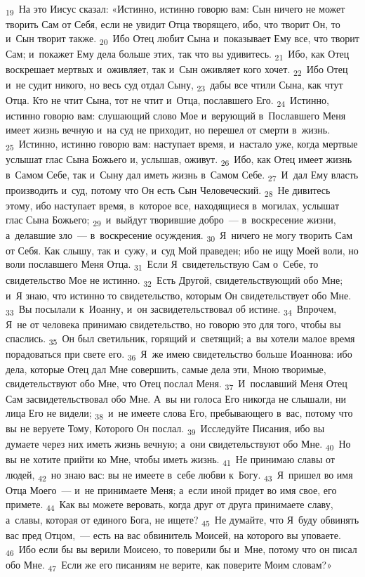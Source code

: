 \documentclass[a4paper,12pt]{article}
\begin{document}
\textsubscript{19}~На это Иисус сказал: «Истинно, истинно говорю вам: Сын ничего не может творить Сам от Себя, если не увидит Отца творящего, ибо, что творит Он, то и~Сын творит также. \textsubscript{20}~Ибо Отец любит Сына и~показывает Ему все, что творит Сам; и~покажет Ему дела больше этих, так что вы удивитесь. \textsubscript{21}~Ибо, как Отец воскрешает мертвых и~оживляет, так и~Сын оживляет кого хочет. \textsubscript{22}~Ибо Отец и~не судит никого, но весь суд отдал Сыну, \textsubscript{23}~дабы все чтили Сына, как чтут Отца. Кто не чтит Сына, тот не чтит и~Отца, пославшего Его. \textsubscript{24}~Истинно, истинно говорю вам: слушающий слово Мое и~верующий в~Пославшего Меня имеет жизнь вечную и~на суд не приходит, но перешел от смерти в~жизнь. \textsubscript{25}~Истинно, истинно говорю вам: наступает время, и~настало уже, когда мертвые услышат глас Сына Божьего и, услышав, оживут. \textsubscript{26}~Ибо, как Отец имеет жизнь в~Самом Себе, так и~Сыну дал иметь жизнь в~Самом Себе. \textsubscript{27}~И~дал Ему власть производить и~суд, потому что Он есть Сын Человеческий. \textsubscript{28}~Не дивитесь этому, ибо наступает время, в~которое все, находящиеся в~могилах, услышат глас Сына Божьего; \textsubscript{29}~и~выйдут творившие добро~--- в~воскресение жизни, а~делавшие зло~--- в~воскресение осуждения. \textsubscript{30}~Я~ничего не могу творить Сам от Себя. Как слышу, так и~сужу, и~суд Мой праведен; ибо не ищу Моей воли, но воли пославшего Меня Отца. \textsubscript{31}~Если Я~свидетельствую Сам о~Себе, то свидетельство Мое не истинно. \textsubscript{32}~Есть Другой, свидетельствующий обо Мне; и~Я знаю, что истинно то свидетельство, которым Он свидетельствует обо Мне. \textsubscript{33}~Вы посылали к~Иоанну, и~он засвидетельствовал об истине. \textsubscript{34}~Впрочем, Я~не от человека принимаю свидетельство, но говорю это для того, чтобы вы спаслись. \textsubscript{35}~Он был светильник, горящий и~светящий; а~вы хотели малое время порадоваться при свете его. \textsubscript{36}~Я~же имею свидетельство больше Иоаннова: ибо дела, которые Отец дал Мне совершить, самые дела эти, Мною творимые, свидетельствуют обо Мне, что Отец послал Меня. \textsubscript{37}~И~пославший Меня Отец Сам засвидетельствовал обо Мне. А~вы ни голоса Его никогда не слышали, ни лица Его не видели; \textsubscript{38}~и~не имеете слова Его, пребывающего в~вас, потому что вы не веруете Тому, Которого Он послал. \textsubscript{39}~Исследуйте Писания, ибо вы думаете через них иметь жизнь вечную; а~они свидетельствуют обо Мне. \textsubscript{40}~Но вы не хотите прийти ко Мне, чтобы иметь жизнь. \textsubscript{41}~Не принимаю славы от людей, \textsubscript{42}~но знаю вас: вы не имеете в~себе любви к~Богу. \textsubscript{43}~Я~пришел во имя Отца Моего~--- и~не принимаете Меня; а~если иной придет во имя свое, его примете. \textsubscript{44}~Как вы можете веровать, когда друг от друга принимаете славу, а~славы, которая от единого Бога, не ищете? \textsubscript{45}~Не думайте, что Я~буду обвинять вас пред Отцом,~--- есть на вас обвинитель Моисей, на которого вы уповаете. \textsubscript{46}~Ибо если бы вы верили Моисею, то поверили бы и~Мне, потому что он писал обо Мне. \textsubscript{47}~Если же его писаниям не верите, как поверите Моим словам?» 
\end{document}
